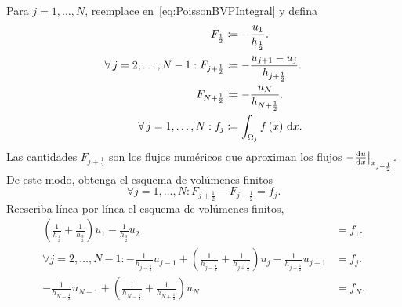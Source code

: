 \begin{frame}
	\frametitle{\secname}

	Para $j=1,\dotsc,N$, reemplace en~\eqref{eq:PoissonBVPIntegral} y
	defina
	\begin{align*}
		F_{\frac{1}{2}}   & \coloneqq
		-\frac{u_{1}}{h_{\frac{1}{2}}}.           \\
		\forall j=2,\dotsc,N-1:
		F_{j+\frac{1}{2}} & \coloneqq
		-\frac{u_{j+1}-u_{j}}{h_{j+\frac{1}{2}}}. \\
		F_{N+\frac{1}{2}} & \coloneqq
		-\frac{u_{N}}{h_{N+\frac{1}{2}}}.         \\
		\forall j=1,\dotsc,N:
		f_{j}             & \coloneqq
		\int_{\Omega_{j}}
		f\left(x\right)\dl x.
	\end{align*}
	Las cantidades $F_{j+\frac{1}{2}}$ son los flujos numéricos que
	aproximan los flujos $-\diff{u}{x}{\big|}_{x_{j+\frac{1}{2}}}$.
	De este modo, obtenga el esquema de volúmenes finitos
	\begin{equation}
		\forall j=1,\dotsc, N:
		F_{j+\frac{1}{2}}-
		F_{j-\frac{1}{2}}=
		f_{j}.
	\end{equation}
	Reescriba línea por línea el esquema de volúmenes finitos,
	\begin{align*}
		\left(
		\frac{1}{h_{\frac{1}{2}}}+\frac{1}{h_{\frac{3}{2}}}
		\right)u_{1}-
		\frac{1}{h_{\frac{3}{2}}}u_{2}     & =
		f_{1}.                                 \\
		\forall j=2,\dotsc,N-1:
		-\frac{1}{h_{j-\frac{1}{2}}}u_{j-1}+
		\left(
		\frac{1}{h_{j-\frac{1}{2}}}+
		\frac{1}{h_{j+\frac{1}{2}}}
		\right)u_{j}-
		\frac{1}{h_{j+\frac{1}{2}}}u_{j+1} & =
		f_{j}.                                 \\
		-\frac{1}{h_{N-\frac{1}{2}}}u_{N-1}+
		\left(
		\frac{1}{h_{N-\frac{1}{2}}}+
		\frac{1}{h_{N+\frac{1}{2}}}
		\right)u_{N}                       & =
		f_{N}.
	\end{align*}
\end{frame}
